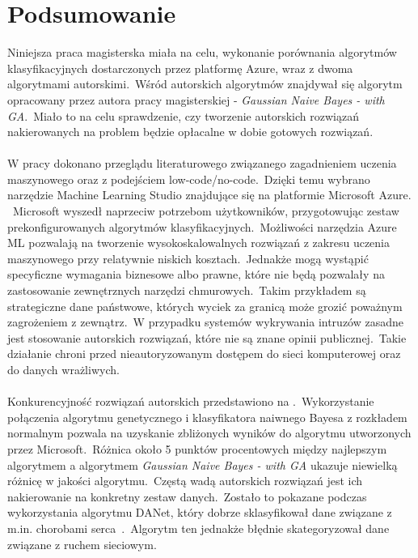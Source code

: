 \chapter{Podsumowanie}
Niniejsza praca magisterska miała na celu, wykonanie porównania algorytmów klasyfikacyjnych dostarczonych przez platformę Azure, wraz z dwoma algorytmami autorskimi.\ Wśród autorskich algorytmów znajdywał się algorytm opracowany przez autora pracy magisterskiej - \textit{Gaussian Naive Bayes - with GA}.\ Miało to na celu sprawdzenie, czy tworzenie autorskich rozwiązań nakierowanych na problem będzie opłacalne w dobie gotowych rozwiązań.
\\ \\
W pracy dokonano przeglądu literaturowego związanego zagadnieniem uczenia maszynowego oraz z podejściem low-code/no-code.\ Dzięki temu wybrano narzędzie Machine Learning Studio znajdujące się na platformie Microsoft Azure. \ Microsoft wyszedł naprzeciw potrzebom użytkowników, przygotowując zestaw prekonfigurowanych algorytmów klasyfikacyjnych.\ Możliwości narzędzia Azure ML pozwalają na tworzenie wysokoskalowalnych rozwiązań z zakresu uczenia maszynowego przy relatywnie niskich kosztach.\ Jednakże mogą wystąpić specyficzne wymagania biznesowe albo prawne, które nie będą pozwalały na zastosowanie zewnętrznych narzędzi chmurowych.\ Takim przykładem są strategiczne dane państwowe, których wyciek za granicą może grozić poważnym zagrożeniem z zewnątrz.\ W przypadku systemów wykrywania intruzów zasadne jest stosowanie autorskich rozwiązań, które nie są znane opinii publicznej.\ Takie działanie chroni przed nieautoryzowanym dostępem do sieci komputerowej oraz do danych wrażliwych.
\\ \\
Konkurencyjność rozwiązań autorskich przedstawiono na .\ Wykorzystanie połączenia algorytmu genetycznego i klasyfikatora naiwnego Bayesa z rozkładem normalnym pozwala na uzyskanie zbliżonych wyników do algorytmu utworzonych przez Microsoft.\ Różnica około 5 punktów procentowych między najlepszym algorytmem a algorytmem \textit{Gaussian Naive Bayes - with GA} ukazuje niewielką różnicę w jakości algorytmu.\ Częstą wadą autorskich rozwiązań jest ich nakierowanie na konkretny zestaw danych.\ Zostało to pokazane podczas wykorzystania algorytmu DANet, który dobrze sklasyfikował dane związane z m.in. chorobami serca~\cite{Chen2022}.\ Algorytm ten jednakże błędnie skategoryzował dane związane z ruchem sieciowym.
\\ \\
